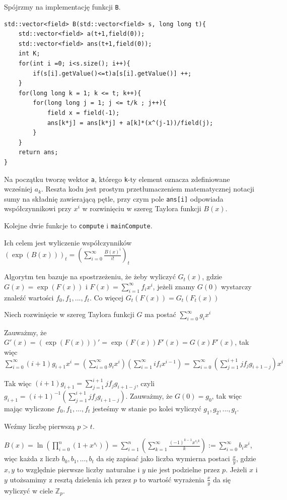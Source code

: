 \documentclass{article}
\begin{document}
Spójrzmy na implementację funkcji \texttt{B}.

\begin{lstlisting}
std::vector<field> B(std::vector<field> s, long long t){
    std::vector<field> a(t+1,field(0));
    std::vector<field> ans(t+1,field(0));
    int K;
    for(int i =0; i<s.size(); i++){
        if(s[i].getValue()<=t)a[s[i].getValue()] ++;
    }
    for(long long k = 1; k <= t; k++){
        for(long long j = 1; j <= t/k ; j++){
            field x = field(-1);
            ans[k*j] = ans[k*j] + a[k]*(x^(j-1))/field(j);
        }
    }
    return ans;
}
\end{lstlisting}

Na początku tworzę wektor \texttt{a}, którego \texttt{k}-ty element oznacza zdefiniowane wcześniej $a_k$. 
Reszta kodu jest prostym przetłumaczeniem matematycznej notacji sumy na składnię zawierającą pętle, przy 
czym pole \texttt{ans[i]} odpowiada współczynnikowi przy $x^i$ w rozwinięciu w szereg Taylora funkcji $B(x)$.

Kolejne dwie funkcje to \texttt{compute} i \texttt{mainCompute}. 



Ich celem jest wyliczenie współczynników $(\exp(B(x)))_t=(\sum_{i=0}^\infty \frac{B(x)^i}{i!})_t$

Algorytm ten bazuje na spostrzeżeniu, że żeby wyliczyć $G_t(x)$, gdzie $G(x)=\exp(F(x))$ i $F(x) =\sum_{i=1}^\infty f_ix^i$,
jeżeli znamy $G(0)$ wystarczy znaleźć wartości $f_0,f_1,...,f_t$. Co więcej $G_t(F(x))=G_t(F_t(x))$

Niech rozwinięcie w szereg Taylora funkcji $G$ ma postać $\sum^{\infty}_{i=0}g_ix^i$

Zauważmy, że $G'(x)=(\exp(F(x)))'=\exp(F(x))F'(x)=G(x)F'(x)$, tak więc
$\sum_{i=0}^{\infty}(i+1)g_{i+1}x^{i}=(\sum_{i=0}^{\infty}g_ix^i)(\sum_{i=1}^{\infty}if_{i}x^{i-1})=
\sum_{i=0}^{\infty}(\sum_{j=1}^{i+1}jf_jg_{i+1-j})x^i$

Tak więc $(i+1)g_{i+1}=\sum_{j=1}^{i+1}jf_jg_{i+1-j}$, czyli $g_{i+1}=(i+1)^{-1}(\sum_{j=1}^{i+1}jf_jg_{i+1-j})$.
Zauważmy, że $G(0)=g_0$, tak więc mając wyliczone $f_0,f_1,...,f_t$ jesteśmy w stanie po kolei wyliczyć $g_1,g_2,...,g_t$.

Weźmy liczbę pierwszą $p>t$.

$B(x)=\ln(\prod_{i=0}^n(1+x^{s_i}))=\sum_{i=1}^{n}(\sum_{k=1}^{\infty}\frac{(-1)^{k-1}x^{s_ik}}{k}):=\sum_{i=0}^{\infty}b_ix^i$, 
więc każda z liczb $b_0,b_1,...,b_t$ da się zapisać jako liczba wymierna postaci $\frac{x}{y}$, gdzie $x,y$ to
względnie pierwsze liczby naturalne i $y$ nie jest podzielne przez $p$. Jeżeli $x$ i $y$ utożsamimy z resztą dzielenia ich 
przez $p$ to wartość wyrażenia $\frac{x}{y}$ da się wyliczyć w ciele $\mathbb{Z}_p$.
\end{document}
